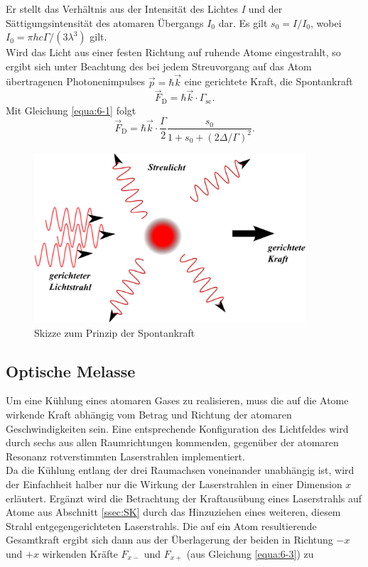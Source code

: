 \documentclass[
class=book,
accentcolor=1b,
custommargins=geometry,
fontsize=11pt,
thesis={type=Versuchsanleitung},
ruledheaders=all,
headline=false,
instbox=false,
marginpar=false,
title=small,
ignore-missing-data=true,
twoside=false,
logofile=apqdesign/tuda_logo.pdf,
pdfa=false %
]{apqpub}
\begin{document}
				Er stellt das Verhältnis aus der Intensität des Lichtes \textit{I} und der Sättigungsintensität des atomaren Übergangs $I_0$ dar. Es gilt $s_0 = I/I_0$, wobei $I_0 = \pi hc\varGamma/(3\lambda^3)$ gilt.\\
				Wird das Licht aus einer festen Richtung auf ruhende Atome eingestrahlt, so ergibt sich unter Beachtung des bei jedem Streuvorgang auf das Atom übertragenen Photonenimpulses $\vec{p} = \hbar \vec{k}$ eine gerichtete Kraft, die Spontankraft	
				\begin{equation}
				\vec{F}_{\text{D}} = \hbar \vec{k} \cdot \varGamma_{\text{sc}}.
				\end{equation}
				Mit Gleichung \eqref{equa:6-1} folgt				
				\begin{equation}\label{equa:6-3}
				\vec{F}_{\text{D}} = \hbar \vec{k} \cdot \frac{\varGamma}{2} \frac{s_0}{1+s_0+(2\varDelta/\varGamma)^2}.
				\end{equation}

				\begin{figure}[htb!]
					\centering
					\includegraphics[width=0.9\textwidth]{graphics/SK.jpg}
					\caption{Skizze zum Prinzip der Spontankraft}
					\label{fig:SK}
				\end{figure}
				
				\subsection{Optische Melasse}				
				Um eine Kühlung eines atomaren Gases zu realisieren, muss die auf die Atome wirkende Kraft abhängig vom Betrag und Richtung der atomaren Geschwindigkeiten sein. Eine entsprechende Konfiguration des Lichtfeldes wird durch sechs aus allen Raumrichtungen kommenden, gegenüber der atomaren Resonanz rotverstimmten Laserstrahlen implementiert.\\
				Da die Kühlung entlang der drei Raumachsen voneinander unabhängig ist, wird der Einfachheit halber
				nur die Wirkung der Laserstrahlen in einer Dimension $x$ erläutert. 
				Ergänzt wird die Betrachtung der Kraftausübung eines Laserstrahls auf Atome aus Abschnitt \ref{ssec:SK} durch das Hinzuziehen eines weiteren, diesem Strahl entgegengerichteten Laserstrahls. 
				Die auf ein Atom resultierende Gesamtkraft ergibt sich dann aus der Überlagerung der beiden in Richtung $-x$ und $+x$ wirkenden Kräfte $F_{x-}$ und $F_{x+}$ (aus Gleichung \eqref{equa:6-3}) zu
				
\end{document}
